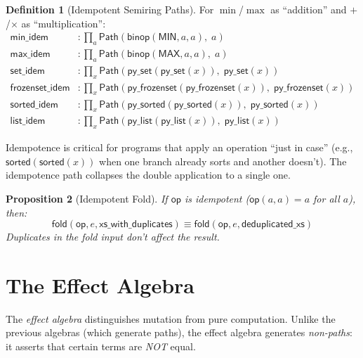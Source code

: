\documentclass[11pt,a4paper]{report}
\theoremstyle{definition}
\newtheorem{definition}{Definition}[chapter]
\theoremstyle{plain}
\newtheorem{proposition}[definition]{Proposition}
\newcommand{\Path}{\mathsf{Path}}
\newcommand{\fold}{\mathsf{fold}}
\newcommand{\op}{\mathsf{op}}
\begin{document}
\begin{definition}[Idempotent Semiring Paths]
For $\min$/$\max$ as ``addition'' and $+$/$\times$ as ``multiplication'':
\begin{align}
  \mathsf{min\_idem} &: \prod_a
    \Path(\mathsf{binop}(\mathsf{MIN}, a, a),\; a)
    \tag{I1} \\
  \mathsf{max\_idem} &: \prod_a
    \Path(\mathsf{binop}(\mathsf{MAX}, a, a),\; a)
    \tag{I2} \\
  \mathsf{set\_idem} &: \prod_x
    \Path(\mathsf{py\_set}(\mathsf{py\_set}(x)),\;
          \mathsf{py\_set}(x))
    \tag{I3} \\
  \mathsf{frozenset\_idem} &: \prod_x
    \Path(\mathsf{py\_frozenset}(\mathsf{py\_frozenset}(x)),\;
          \mathsf{py\_frozenset}(x))
    \tag{I4} \\
  \mathsf{sorted\_idem} &: \prod_x
    \Path(\mathsf{py\_sorted}(\mathsf{py\_sorted}(x)),\;
          \mathsf{py\_sorted}(x))
    \tag{I5} \\
  \mathsf{list\_idem} &: \prod_x
    \Path(\mathsf{py\_list}(\mathsf{py\_list}(x)),\;
          \mathsf{py\_list}(x))
    \tag{I6}
\end{align}
\end{definition}

Idempotence is critical for programs that apply an operation
``just in case'' (e.g., $\mathsf{sorted}(\mathsf{sorted}(x))$ when
one branch already sorts and another doesn't).  The idempotence path
collapses the double application to a single one.

\begin{proposition}[Idempotent Fold]
If $\op$ is idempotent ($\op(a, a) = a$ for all $a$), then:
\[
  \fold(\op, e, \mathsf{xs\_with\_duplicates}) \equiv
  \fold(\op, e, \mathsf{deduplicated\_xs})
\]
Duplicates in the fold input don't affect the result.
\end{proposition}


\section{The Effect Algebra}

The \emph{effect algebra} distinguishes mutation from pure computation.
Unlike the previous algebras (which generate paths), the effect
algebra generates \emph{non-paths}: it asserts that certain terms
are \emph{NOT} equal.
\end{document}
